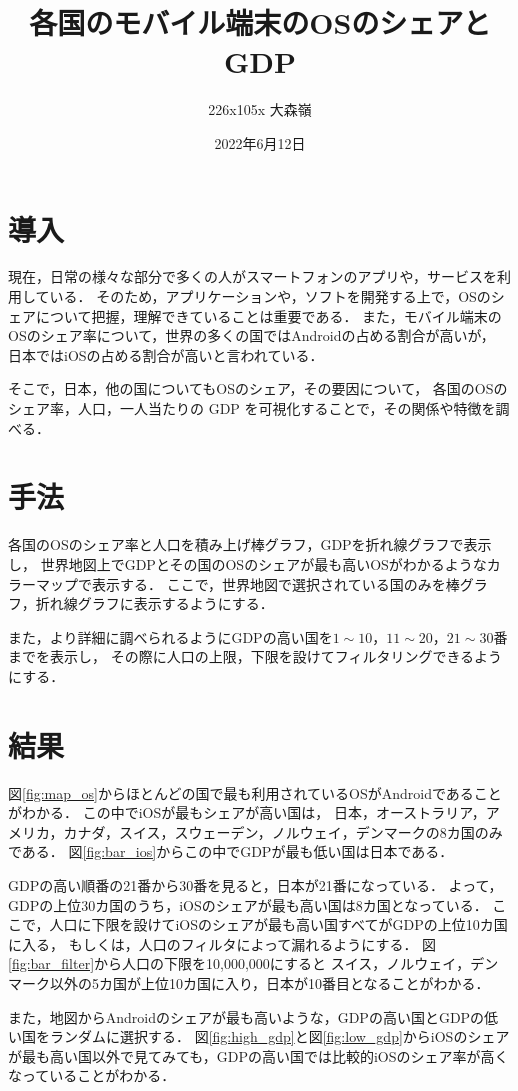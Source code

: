 \documentclass[12pt, a4paper]{jarticle}
\title{各国のモバイル端末のOSのシェアとGDP}
\author{226x105x 大森嶺}
\date{2022年6月12日}
\begin{document}
\maketitle

\section{導入}
現在，日常の様々な部分で多くの人がスマートフォンのアプリや，サービスを利用している．
そのため，アプリケーションや，ソフトを開発する上で，OSのシェアについて把握，理解できていることは重要である．
また，モバイル端末のOSのシェア率について，世界の多くの国ではAndroidの占める割合が高いが，
日本ではiOSの占める割合が高いと言われている．

そこで，日本，他の国についてもOSのシェア，その要因について，
各国のOSのシェア率，人口，一人当たりの GDP を可視化することで，その関係や特徴を調べる．

\section{手法}
各国のOSのシェア率と人口を積み上げ棒グラフ，GDPを折れ線グラフで表示し，
世界地図上でGDPとその国のOSのシェアが最も高いOSがわかるようなカラーマップで表示する．
ここで，世界地図で選択されている国のみを棒グラフ，折れ線グラフに表示するようにする．

また，より詳細に調べられるようにGDPの高い国を$1 \sim 10，11 \sim 20，21 \sim 30$番までを表示し，
その際に人口の上限，下限を設けてフィルタリングできるようにする．

\section{結果}
図\ref{fig:map_os}からほとんどの国で最も利用されているOSがAndroidであることがわかる．
この中でiOSが最もシェアが高い国は，
日本，オーストラリア，アメリカ，カナダ，スイス，スウェーデン，ノルウェイ，デンマークの8カ国のみである．
図\ref{fig:bar_ios}からこの中でGDPが最も低い国は日本である．

GDPの高い順番の21番から30番を見ると，日本が21番になっている．
よって，GDPの上位30カ国のうち，iOSのシェアが最も高い国は8カ国となっている．
ここで，人口に下限を設けてiOSのシェアが最も高い国すべてがGDPの上位10カ国に入る，
もしくは，人口のフィルタによって漏れるようにする．
図\ref{fig:bar_filter}から人口の下限を10,000,000にすると
スイス，ノルウェイ，デンマーク以外の5カ国が上位10カ国に入り，日本が10番目となることがわかる．

また，地図からAndroidのシェアが最も高いような，GDPの高い国とGDPの低い国をランダムに選択する．
図\ref{fig:high_gdp}と図\ref{fig:low_gdp}からiOSのシェアが最も高い国以外で見てみても，GDPの高い国では比較的iOSのシェア率が高くなっていることがわかる．
\end{document}

